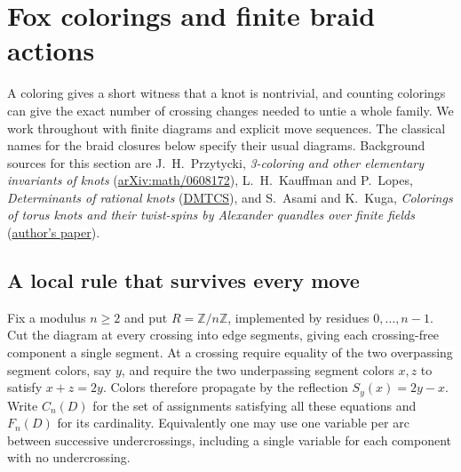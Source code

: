 \section{Fox colorings and finite braid actions}
\label{sec:fox}

A coloring gives a short witness that a knot is nontrivial, and counting
colorings can give the exact number of crossing changes needed to untie a
whole family. We work throughout with finite diagrams and explicit move
sequences. The classical names for the braid closures below specify their
usual diagrams. Background sources for this section are
J.~H.~Przytycki, \emph{3-coloring and other elementary invariants of knots}
(\href{https://arxiv.org/abs/math/0608172}{arXiv:math/0608172}),
L.~H.~Kauffman and P.~Lopes, \emph{Determinants of rational knots}
(\href{https://dmtcs.episciences.org/articles/454}{DMTCS}), and
S.~Asami and K.~Kuga, \emph{Colorings of torus knots and their
twist-spins by Alexander quandles over finite fields}
(\href{https://www.math.s.chiba-u.ac.jp/~xasami/library/coloring.pdf}{author's paper}).

\subsection{A local rule that survives every move}

Fix a modulus $n\ge2$ and put $R=\mathbb Z/n\mathbb Z$, implemented by
residues $0,\ldots,n-1$. Cut the diagram at every crossing into edge
segments, giving each crossing-free component a single segment. At a
crossing require equality of the two overpassing segment colors, say $y$,
and require the two underpassing segment colors $x,z$ to satisfy
$x+z=2y$. Colors therefore propagate by the reflection
$S_y(x)=2y-x$. Write $C_n(D)$ for the set of assignments satisfying all
these equations and $F_n(D)$ for its cardinality. Equivalently one may use
one variable per arc between successive undercrossings, including a single
variable for each component with no undercrossing.

